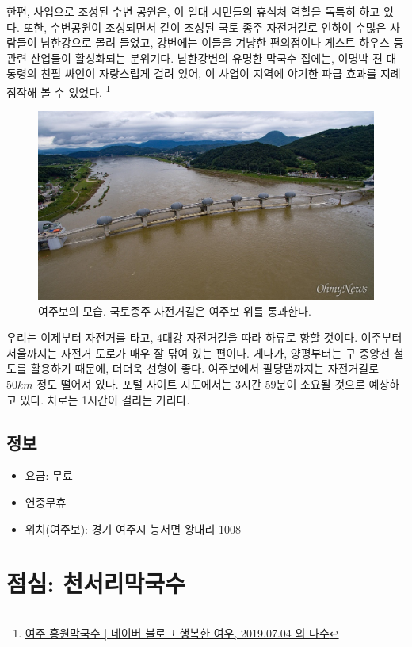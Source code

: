한편, 사업으로 조성된 수변 공원은, 이 일대 시민들의 휴식처 역할을 독특히 하고 있다.
또한, 수변공원이 조성되면서 같이 조성된 국토 종주 자전거길로 인하여 수많은 사람들이 남한강으로 몰려 들었고,
강변에는 이들을 겨냥한 편의점이나 게스트 하우스 등 관련 산업들이 활성화되는 분위기다.
남한강변의 유명한 막국수 집에는, 이명박 젼 대통령의 친필 싸인이 자랑스럽게 걸려 있어,
이 사업이 지역에 야기한 파급 효과를 지례 짐작해 볼 수 있었다.
\footnote{\href{https://blog.naver.com/lovelyiii/221577715597}{여주 흥원막국수 | 네이버 블로그 행복한 여우, 2019.07.04 외 다수}}

\begin{figure}[ht]
    \centering
    \includegraphics[width=.6\textwidth]{img/여주보.jpg}
    \caption{여주보의 모습. 국토종주 자전거길은 여주보 위를 통과한다. \protect\footnotemark}
    \label{fig:my_labe7}
\end{figure}


우리는 이제부터 자전거를 타고, 4대강 자전거길을 따라 하류로 향할 것이다.
여주부터 서울까지는 자전거 도로가 매우 잘 닦여 있는 편이다.
게다가, 양평부터는 구 중앙선 철도를 활용하기 때문에, 더더욱 선형이 좋다.
여주보에서 팔당댐까지는 자전거길로 $50km$ 정도 떨어져 있다. 
포털 사이트 지도에서는 3시간 59분이 소요될 것으로 예상하고 있다.
차로는 1시간이 걸리는 거리다.

\subsection{정보}
\begin{itemize}
    \item 요금: 무료
    \item 연중무휴
    \item 위치(여주보): 경기 여주시 능서면 왕대리 1008 
\end{itemize}

\section{점심: 천서리막국수}


